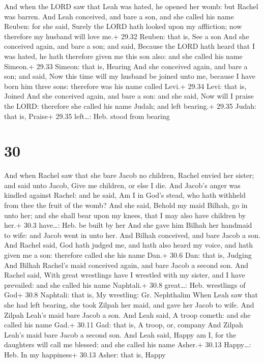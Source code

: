  And when the LORD saw that Leah was hated, he opened her
womb: but Rachel was barren.  And Leah conceived, and bare
a son, and she called his name Reuben: for she said, Surely the LORD
hath looked upon my affliction; now therefore my husband will love me.+
29.32 Reuben: that is, See a son  And she conceived again,
and bare a son; and said, Because the LORD hath heard that I was hated,
he hath therefore given me this son also: and she called his name
Simeon.+ 29.33 Simeon: that is, Hearing  And she conceived
again, and bare a son; and said, Now this time will my husband be joined
unto me, because I have born him three sons: therefore was his name
called Levi.+ 29.34 Levi: that is, Joined  And she
conceived again, and bare a son: and she said, Now will I praise the
LORD: therefore she called his name Judah; and left bearing.+ 29.35
Judah: that is, Praise+ 29.35 left\ldots: Heb. stood from bearing

\hypertarget{section-29}{%
\section{30}\label{section-29}}

 And when Rachel saw that she bare Jacob no children, Rachel
envied her sister; and said unto Jacob, Give me children, or else I die.
 And Jacob's anger was kindled against Rachel: and he said,
Am I in God's stead, who hath withheld from thee the fruit of the womb?
 And she said, Behold my maid Bilhah, go in unto her; and
she shall bear upon my knees, that I may also have children by her.+
30.3 have\ldots: Heb. be built by her  And she gave him
Bilhah her handmaid to wife: and Jacob went in unto her. 
And Bilhah conceived, and bare Jacob a son.  And Rachel
said, God hath judged me, and hath also heard my voice, and hath given
me a son: therefore called she his name Dan.+ 30.6 Dan: that is, Judging
 And Bilhah Rachel's maid conceived again, and bare Jacob a
second son.  And Rachel said, With great wrestlings have I
wrestled with my sister, and I have prevailed: and she called his name
Naphtali.+ 30.8 great\ldots: Heb. wrestlings of God+ 30.8 Naphtali: that
is, My wrestling: Gr. Nephthalim  When Leah saw that she had
left bearing, she took Zilpah her maid, and gave her Jacob to wife.
 And Zilpah Leah's maid bare Jacob a son.  And
Leah said, A troop cometh: and she called his name Gad.+ 30.11 Gad: that
is, A troop, or, company  And Zilpah Leah's maid bare Jacob
a second son.  And Leah said, Happy am I, for the daughters
will call me blessed: and she called his name Asher.+ 30.13 Happy\ldots:
Heb. In my happiness+ 30.13 Asher: that is, Happy


